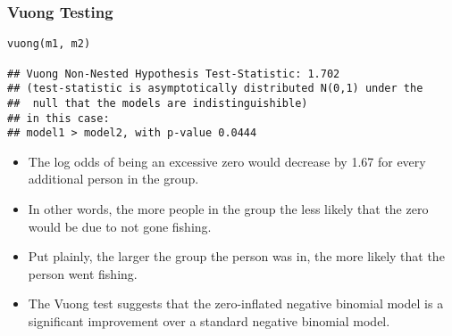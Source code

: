 \documentclass[MASTER.tex]{subfiles}
\begin{document}
\begin{frame}[fragile]
\frametitle{Vuong Testing}
	\begin{verbatim}
vuong(m1, m2)
 
## Vuong Non-Nested Hypothesis Test-Statistic: 1.702 
## (test-statistic is asymptotically distributed N(0,1) under the
##  null that the models are indistinguishible)
## in this case:
## model1 > model2, with p-value 0.0444
\end{verbatim}
\end{frame}

\begin{frame}
\begin{itemize}
\item The log odds of being an excessive zero would decrease by 1.67 for every additional person in the group. 
\item In other words, the more people in the group the less likely that the zero would be due to not gone fishing. 
\item Put plainly, the larger the group the person was in, the more likely that the person went fishing.
\item The Vuong test suggests that the zero-inflated negative binomial model is a significant improvement over a standard negative binomial model. 
\end{itemize}
\end{frame}
\end{document}
